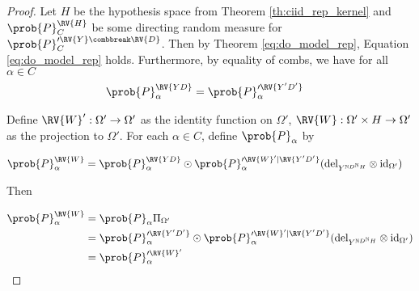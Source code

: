 \begin{proof}
Let $H$ be the hypothesis space from Theorem \ref{th:ciid_rep_kernel} and $\prob{P}_C^{\RV{H}}$ be some directing random measure for $\prob{P}_C^{\prime \RV{Y}\combbreak \RV{D}}$. Then by Theorem \ref{eq:do_model_rep}, Equation \ref{eq:do_model_rep} holds. Furthermore, by equality of combs, we have for all $\alpha\in C$
\begin{align}
	\prob{P}_\alpha^{\RV{YD}} &= \prob{P}_\alpha^{\prime \RV{Y'D'}}
\end{align}

Define $\RV{W}':\Omega'\to \Omega'$ as the identity function on $\Omega'$, $\RV{W}:\Omega'\times H\to \Omega'$ as the projection to $\Omega'$. For each $\alpha\in C$, define $\prob{P}_\alpha$ by

\begin{align}
	\prob{P}_\alpha^{\RV{W}} &= \prob{P}_\alpha^{\RV{YD}}\odot \prob{P}_\alpha^{\prime \RV{W}'|\RV{Y'D'}} (\mathrm{del}_{Y^{\mathbb{N}D^{\mathbb{N}}H}}\otimes \mathrm{id}_{\Omega'})
\end{align}

Then

\begin{align}
	\prob{P}_\alpha^{\RV{W}} &= \prob{P}_\alpha\Pi_{\Omega'}\\
	&= \prob{P}_\alpha^{\prime \RV{Y'D'}}\odot \prob{P}_\alpha^{\prime \RV{W}'|\RV{Y'D'}}(\mathrm{del}_{Y^{\mathbb{N}D^{\mathbb{N}}H}}\otimes \mathrm{id}_{\Omega'})\\
	&= \prob{P}_\alpha^{\prime \RV{W}'}
\end{align}
\end{proof}